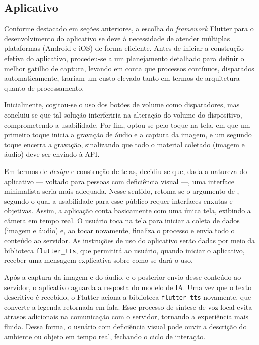 \subsection{Aplicativo}

Conforme destacado em seções anteriores, a escolha do \textit{framework} Flutter para o desenvolvimento do aplicativo se deve à necessidade de atender múltiplas plataformas (Android e iOS) de forma eficiente. Antes de iniciar a construção efetiva do aplicativo, procedeu-se a um planejamento detalhado para definir o melhor gatilho de captura, levando em conta que processos contínuos, disparados automaticamente, trariam um custo elevado tanto em termos de arquitetura quanto de processamento.

Inicialmente, cogitou-se o uso dos botões de volume como disparadores, mas concluiu-se que tal solução interferiria na alteração do volume do dispositivo, comprometendo a usabilidade. Por fim, optou-se pelo toque na tela, em que um primeiro toque inicia a gravação de áudio e a captura da imagem, e um segundo toque encerra a gravação, sinalizando que todo o material coletado (imagem e áudio) deve ser enviado à API.

Em termos de \textit{design} e construção de telas, decidiu-se que, dada a natureza do aplicativo — voltado para pessoas com deficiência visual —, uma interface minimalista seria mais adequada. Nesse sentido, retoma-se o argumento de , segundo o qual a usabilidade para esse público requer interfaces enxutas e objetivas. Assim, a aplicação conta basicamente com uma única tela, exibindo a câmera em tempo real. O usuário toca na tela para iniciar a coleta de dados (imagem e áudio) e, ao tocar novamente, finaliza o processo e envia todo o conteúdo ao servidor. As instruções de uso do aplicativo serão dadas por meio da biblioteca \texttt{flutter\_tts}, que permitirá ao usuário, quando iniciar o aplicativo, receber uma mensagem explicativa sobre como se dará o uso.

Após a captura da imagem e do áudio, e o posterior envio desse conteúdo ao servidor, o aplicativo aguarda a resposta do modelo de IA. Uma vez que o texto descritivo é recebido, o Flutter aciona a biblioteca \texttt{flutter\_tts} novamente, que converte a legenda retornada em fala. Esse processo de síntese de voz local evita atrasos adicionais na comunicação com o servidor, tornando a experiência mais fluida. Dessa forma, o usuário com deficiência visual pode ouvir a descrição do ambiente ou objeto em tempo real, fechando o ciclo de interação.

